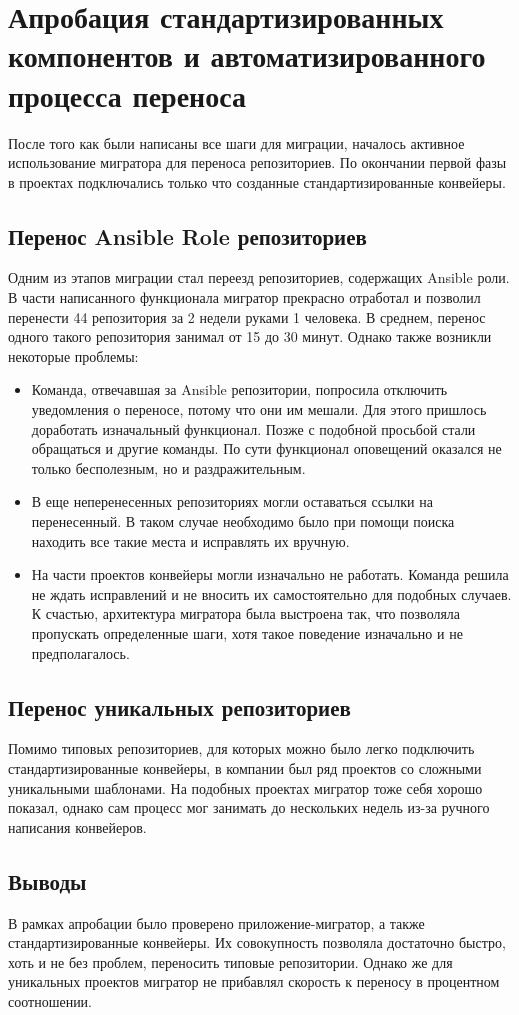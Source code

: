\chapter{Апробация стандартизированных компонентов и автоматизированного процесса переноса} \label{ch:ch4}
После того как были написаны все шаги для миграции, началось активное использование мигратора для переноса репозиториев.
По окончании первой фазы в проектах подключались только что созданные стандартизированные конвейеры.

\section{Перенос Ansible Role репозиториев} \label{sec:ansible-role-migration}
Одним из этапов миграции стал переезд репозиториев, содержащих Ansible роли\cite{ansible-roles}.
В части написанного функционала мигратор прекрасно отработал и позволил перенести 44 репозитория за 2 недели руками 1 человека.
В среднем, перенос одного такого репозитория занимал от 15 до 30 минут.
Однако также возникли некоторые проблемы:
\begin{itemize}
  \item Команда, отвечавшая за Ansible репозитории, попросила отключить уведомления о переносе, потому что они им мешали.
        Для этого пришлось доработать изначальный функционал.
        Позже с подобной просьбой стали обращаться и другие команды.
        По сути функционал оповещений оказался не только бесполезным, но и раздражительным.
  \item В еще неперенесенных репозиториях могли оставаться ссылки на перенесенный.
        В таком случае необходимо было при помощи поиска находить все такие места и исправлять их вручную.
  \item На части проектов конвейеры могли изначально не работать.
        Команда решила не ждать исправлений и не вносить их самостоятельно для подобных случаев.
        К счастью, архитектура мигратора была выстроена так, что позволяла пропускать определенные шаги, хотя
        такое поведение изначально и не предполагалось.
\end{itemize}

\section{Перенос уникальных репозиториев} \label{sec:custom-repo-translation}
Помимо типовых репозиториев, для которых можно было легко подключить стандартизированные конвейеры,
в компании был ряд проектов со сложными уникальными шаблонами.
На подобных проектах мигратор тоже себя хорошо показал, однако сам процесс мог занимать до нескольких недель
из-за ручного написания конвейеров.

\section{Выводы} \label{sec:conclusion}
В рамках апробации было проверено приложение-мигратор, а также стандартизированные конвейеры.
Их совокупность позволяла достаточно быстро, хоть и не без проблем, переносить типовые репозитории.
Однако же для уникальных проектов мигратор не прибавлял скорость к переносу в процентном соотношении.

